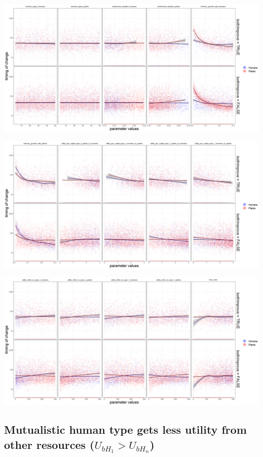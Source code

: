 \documentclass[
]{book}
\begin{document}
\includegraphics[width=1\linewidth]{plots/5_LHS_bothImprove_timing_bifurcationPlot_twoVariables_per_parameter_and_scenario_part1}

\includegraphics[width=1\linewidth]{plots/5_LHS_bothImprove_timing_bifurcationPlot_twoVariables_per_parameter_and_scenario_part2}

\includegraphics[width=1\linewidth]{plots/5_LHS_bothImprove_timing_bifurcationPlot_twoVariables_per_parameter_and_scenario_part3}

\newpage

\hypertarget{mutualistic-human-type-gets-less-utility-from-other-resources-u_bh_1u_bh_n}{%
\subsection{\texorpdfstring{Mutualistic human type gets less utility from other resources (\(U_{bH_{1}}>U_{bH_{n}}\))}{Mutualistic human type gets less utility from other resources (U\_\{bH\_\{1\}\}\textgreater U\_\{bH\_\{n\}\})}}\label{mutualistic-human-type-gets-less-utility-from-other-resources-u_bh_1u_bh_n}}
\end{document}

